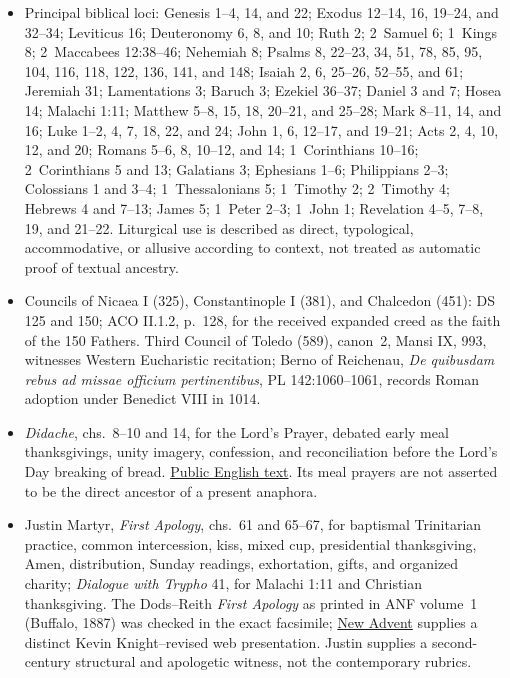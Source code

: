 \begin{itemize}
  \item Principal biblical loci: Genesis 1--4, 14, and 22; Exodus 12--14, 16, 19--24, and 32--34; Leviticus 16; Deuteronomy 6, 8, and 10; Ruth 2; 2~Samuel 6; 1~Kings 8; 2~Maccabees 12:38--46; Nehemiah 8; Psalms 8, 22--23, 34, 51, 78, 85, 95, 104, 116, 118, 122, 136, 141, and 148; Isaiah 2, 6, 25--26, 52--55, and 61; Jeremiah 31; Lamentations 3; Baruch 3; Ezekiel 36--37; Daniel 3 and 7; Hosea 14; Malachi 1:11; Matthew 5--8, 15, 18, 20--21, and 25--28; Mark 8--11, 14, and 16; Luke 1--2, 4, 7, 18, 22, and 24; John 1, 6, 12--17, and 19--21; Acts 2, 4, 10, 12, and 20; Romans 5--6, 8, 10--12, and 14; 1~Corinthians 10--16; 2~Corinthians 5 and 13; Galatians 3; Ephesians 1--6; Philippians 2--3; Colossians 1 and 3--4; 1~Thessalonians 5; 1~Timothy 2; 2~Timothy 4; Hebrews 4 and 7--13; James 5; 1~Peter 2--3; 1~John 1; Revelation 4--5, 7--8, 19, and 21--22. Liturgical use is described as direct, typological, accommodative, or allusive according to context, not treated as automatic proof of textual ancestry.
  \item Councils of Nicaea I (325), Constantinople I (381), and Chalcedon (451): DS 125 and 150; ACO II.1.2, p.~128, for the received expanded creed as the faith of the 150 Fathers. Third Council of Toledo (589), canon~2, Mansi IX, 993, witnesses Western Eucharistic recitation; Berno of Reichenau, \emph{De quibusdam rebus ad missae officium pertinentibus}, PL 142:1060--1061, records Roman adoption under Benedict VIII in 1014.
  \item \emph{Didache}, chs.~8--10 and 14, for the Lord's Prayer, debated early meal thanksgivings, unity imagery, confession, and reconciliation before the Lord's Day breaking of bread. \href{https://www.newadvent.org/fathers/0714.htm}{Public English text}. Its meal prayers are not asserted to be the direct ancestor of a present anaphora.
  \item Justin Martyr, \emph{First Apology}, chs.~61 and 65--67, for baptismal Trinitarian practice, common intercession, kiss, mixed cup, presidential thanksgiving, Amen, distribution, Sunday readings, exhortation, gifts, and organized charity; \emph{Dialogue with Trypho} 41, for Malachi 1:11 and Christian thanksgiving. The Dods--Reith \emph{First Apology} as printed in ANF volume~1 (Buffalo, 1887) was checked in the exact facsimile; \href{https://www.newadvent.org/fathers/0126.htm}{New Advent} supplies a distinct Kevin Knight--revised web presentation. Justin supplies a second-century structural and apologetic witness, not the contemporary rubrics.

\end{itemize}

